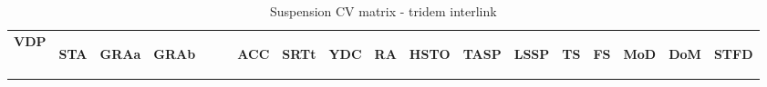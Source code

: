 \begin{table}[H]
\centering\scriptsize
\caption{Suspension CV matrix - tridem interlink}   
\label{table:suspension-cv-tridem-interlink}
\begin{tabular}{|l|c|c|c|c|c|c|c|c|c|c|c|c|c|c|c|}

\hline
\multicolumn{1}{|c|}{\textbf{VDP}} & \begin{sideways}\textbf{STA}\end{sideways} & \begin{sideways}\textbf{GRAa}\end{sideways} & \begin{sideways}\textbf{GRAb~~~~}\end{sideways} & \begin{sideways}\textbf{ACC}\end{sideways} & \begin{sideways}\textbf{SRTt}\end{sideways} & \begin{sideways}\textbf{YDC}\end{sideways} & \begin{sideways}\textbf{RA}\end{sideways} & \begin{sideways}\textbf{HSTO}\end{sideways} & \begin{sideways}\textbf{TASP}\end{sideways} & \begin{sideways}\textbf{LSSP}\end{sideways} & \begin{sideways}\textbf{TS}\end{sideways} & \begin{sideways}\textbf{FS}\end{sideways} & \begin{sideways}\textbf{MoD}\end{sideways} & \begin{sideways}\textbf{DoM}\end{sideways} & \begin{sideways}\textbf{STFD}\end{sideways} \bigstrut \\


\end{tabular}
\end{table}
